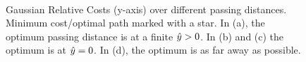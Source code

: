 \begin{figure}[t]
\centering
{}
\qquad
{}\\
\qquad
{}
\caption{Gaussian Relative Costs (y-axis) over different passing distances. Minimum cost/optimal path marked with a star. In (a), the optimum passing distance is at a finite $\hat{y}>0$. In (b) and (c) the optimum is at $\hat{y}=0$. In (d), the optimum is as far away as possible. }
\label{fig:globfig}
\end{figure}

